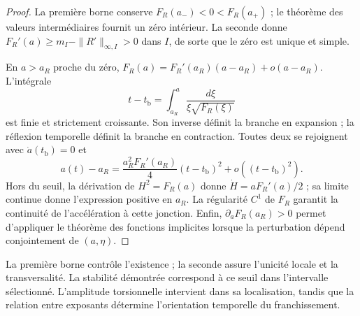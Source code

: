 \begin{proof}
La première borne conserve \(F_R(a_-)<0<F_R(a_+)\) ; le théorème des valeurs intermédiaires fournit un zéro intérieur. La seconde donne \(F_R'(a)\geq m_I-\|R'\|_{\infty,I}>0\) dans \(I\), de sorte que le zéro est unique et simple.

En \(a>a_R\) proche du zéro,
\(F_R(a)=F_R'(a_R)(a-a_R)+o(a-a_R)\).
L'intégrale
\[
 t-t_{\mathrm b}=\int_{a_R}^{a}
          \frac{d\xi}{\xi\sqrt{F_R(\xi)}}
\]
est finie et strictement croissante. Son inverse définit la branche
en expansion ; la réflexion temporelle définit la branche en contraction.
Toutes deux se rejoignent avec \(\dot a(t_{\mathrm b})=0\) et
\[
 a(t)-a_R
 =\frac{a_R^2F_R'(a_R)}4(t-t_{\mathrm b})^2
   +o((t-t_{\mathrm b})^2).
\]
Hors du seuil, la dérivation de \(H^2=F_R(a)\) donne
\(\dot H=aF_R'(a)/2\) ; sa limite continue donne l'expression positive
en \(a_R\). La régularité \(C^1\) de \(F_R\) garantit la continuité
de l'accélération à cette jonction. Enfin,
\(\partial_aF_R(a_R)>0\) permet d'appliquer le théorème des fonctions
implicites lorsque la perturbation dépend conjointement de \((a,\eta)\).
\end{proof}

La première borne contrôle l'existence ; la seconde assure l'unicité locale et la transversalité. La stabilité démontrée correspond à ce seuil dans l'intervalle sélectionné. L'amplitude torsionnelle intervient dans sa localisation, tandis que la relation entre exposants détermine l'orientation temporelle du franchissement.
